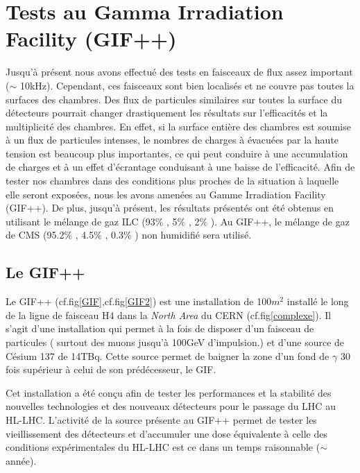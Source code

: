 \section {Tests au Gamma Irradiation Facility (GIF++)}
Jusqu'à présent nous avons effectué des tests en faisceaux de flux assez important ($\sim$ 10kHz). Cependant, ces faisceaux sont bien localisés et ne couvre pas toutes la surfaces des chambres. Des flux de particules similaires sur toutes la surface du détecteurs pourrait changer drastiquement les résultats sur l'efficacités et la multiplicité des chambres. En effet, si la surface entière des chambres est soumise à un flux de particules intenses, le nombres de charges à évacuées par la haute tension est beaucoup plus importantes, ce qui peut conduire à une accumulation de charges et à un effet d'écrantage conduisant à une baisse de l'efficacité. Afin de tester nos chambres dans des conditions plus proches de la situation à laquelle elle seront exposées, nous les avons amenées au Gamme Irradiation Facility (GIF++). De plus, jusqu'à présent, les résultats présentés ont été obtenus en utilisant le mélange de gaz ILC (93\% , 5\% , 2\% ). Au GIF++, le mélange de gaz de CMS (95.2\% , 4.5\% , 0.3\% ) non humidifié sera utilisé.

\subsection{Le GIF++}
Le GIF++ \cite{Jakel:1977147} (cf.fig\ref{GIF},cf.fig\ref{GIF2}) est une installation de 100$m^2$ installé le long de la ligne de faisceau H4 dans la \textit{North Area} du CERN (cf.fig\ref{complexe}). Il s'agit d'une installation qui permet à la fois de disposer d'un faisceau de particules ( surtout des muons jusqu'à 100GeV d'impulsion.) et d'une source de Césium 137 de 14TBq. Cette source permet de baigner la zone d'un fond de $\gamma$ 30 fois supérieur à celui de son prédécesseur, le GIF.

Cet installation a été conçu afin de tester les performances et la stabilité des nouvelles technologies et des nouveaux détecteurs pour le passage du LHC au HL-LHC. L'activité de la source présente au GIF++ permet de tester les vieillissement des détecteurs et d'accumuler une dose équivalente à celle des conditions expérimentales du HL-LHC est ce dans un temps raisonnable ($\sim$ année). 

